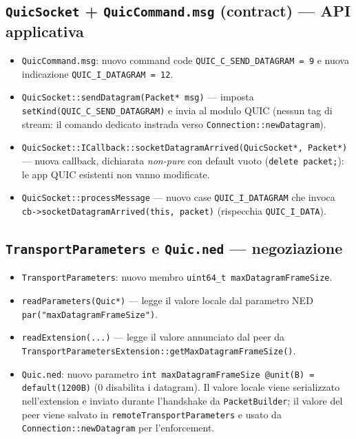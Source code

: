 \documentclass[11pt,a4paper]{article}
\newcommand{\code}[1]{\texttt{#1}}
\begin{document}
\subsection{\code{QuicSocket} + \code{QuicCommand.msg} (contract) --- API applicativa}
\begin{itemize}[nosep,leftmargin=1.4em]
  \item \code{QuicCommand.msg}: nuovo command code \code{QUIC\_C\_SEND\_DATAGRAM = 9} e nuova indicazione
    \code{QUIC\_I\_DATAGRAM = 12}.
  \item \code{QuicSocket::sendDatagram(Packet* msg)} --- imposta \code{setKind(QUIC\_C\_SEND\_DATAGRAM)} e invia
    al modulo QUIC (nessun tag di stream: il comando dedicato instrada verso \code{Connection::newDatagram}).
  \item \code{QuicSocket::ICallback::socketDatagramArrived(QuicSocket*, Packet*)} --- nuova callback,
    dichiarata \emph{non-pure} con default vuoto (\code{delete packet;}): le app QUIC esistenti non vanno
    modificate.
  \item \code{QuicSocket::processMessage} --- nuovo case \code{QUIC\_I\_DATAGRAM} che invoca
    \code{cb->socketDatagramArrived(this, packet)} (rispecchia \code{QUIC\_I\_DATA}).
\end{itemize}

\subsection{\code{TransportParameters} e \code{Quic.ned} --- negoziazione}
\begin{itemize}[nosep,leftmargin=1.4em]
  \item \code{TransportParameters}: nuovo membro \code{uint64\_t maxDatagramFrameSize}.
  \item \code{readParameters(Quic*)} --- legge il valore locale dal parametro NED
    \code{par("maxDatagramFrameSize")}.
  \item \code{readExtension(...)} --- legge il valore annunciato dal peer da
    \code{TransportParametersExtension::getMaxDatagramFrameSize()}.
  \item \code{Quic.ned}: nuovo parametro \code{int maxDatagramFrameSize @unit(B) = default(1200B)}
    (0 disabilita i datagram). Il valore locale viene serializzato nell'extension e inviato durante
    l'handshake da \code{PacketBuilder}; il valore del peer viene salvato in \code{remoteTransportParameters}
    e usato da \code{Connection::newDatagram} per l'enforcement.
\end{itemize}
\end{document}
